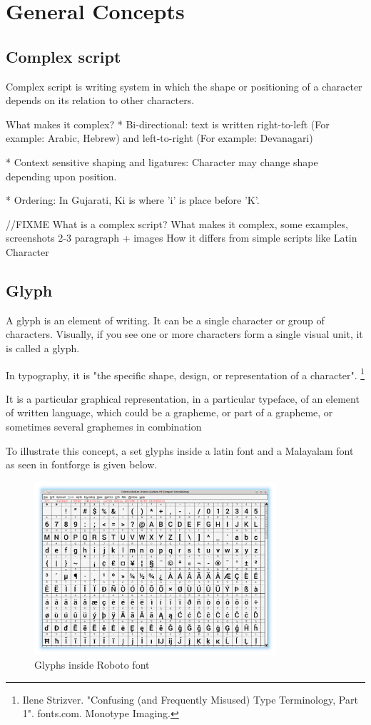 \chapter{General Concepts}

\section{Complex script }

Complex script is writing system in which the shape or positioning of a character
depends on its relation to other characters.

What makes it complex?
* Bi-directional: text is written right-to-left (For example: Arabic, Hebrew)
and left-to-right (For example: Devanagari)

* Context sensitive shaping and ligatures: Character may change shape depending
upon position.

* Ordering:
In Gujarati, Ki is where 'i' is place before 'K'.

//FIXME
What is a complex script? What makes it complex, some examples, screenshots
2-3 paragraph + images
How it differs from simple scripts like Latin Character

\section{Glyph }

A glyph is an element of writing. It can be a single character or group of characters. 
Visually, if you see one or more characters form a single visual unit, it is called a glyph.

In typography, it is "the specific shape, design, or representation of a character".
\footnote{Ilene Strizver. "Confusing (and Frequently Misused) Type Terminology, Part 1". fonts.com. Monotype Imaging.}

It is a particular graphical representation, in a particular typeface, of an element of written language, which could be a grapheme, or part of a grapheme, or sometimes several graphemes in combination 
 
To illustrate this concept, a set glyphs inside a latin font and a Malayalam font as seen in fontforge is given below.

\begin{figure}[h]
    \centering
    \includegraphics[width=0.8\textwidth]{glyph-fontforge-roboto.png}
    \caption{Glyphs inside Roboto font}
\end{figure}

